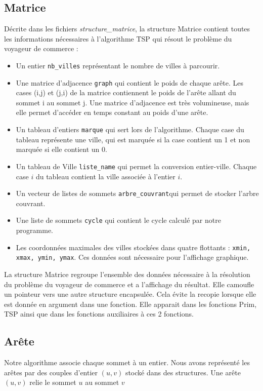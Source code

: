 \documentclass[a4paper,11pt]{article}
\begin{document}
\subsection{Matrice} %
Décrite dans les fichiers \emph{structure\_matrice}, la structure \textsf{Matrice} contient toutes les informations nécessaires à l'algorithme TSP qui résout le problème du voyageur de commerce :
\begin{itemize}
\renewcommand{\FrenchLabelItem}{\textbullet}
\item Un entier \texttt{nb\_villes} représentant le nombre de villes à parcourir.
\item Une matrice d'adjacence \texttt{graph} qui contient le poids de chaque arête. Les cases (i,j) et (j,i) de la matrice contiennent le poids de l'arête allant du sommet i au sommet j. Une matrice d'adjacence est très volumineuse, mais elle permet d'accéder en temps constant au poids d'une arête.
\item Un tableau d'entiers \texttt{marque} qui sert lors de l'algorithme. Chaque case du tableau représente une ville, qui est marquée si la case contient un 1 et non marquée si elle contient un 0.
\item Un tableau de \textsf{Ville} \texttt{liste\_name} qui permet la conversion entier-ville. Chaque case $i$ du tableau contient la ville associée à l'entier $i$.
\item Un vecteur de listes de sommets \texttt{arbre\_couvrant}qui permet de stocker l'arbre couvrant.
\item Une liste de sommets \texttt{cycle} qui contient le cycle calculé par notre programme.
\item Les coordonnées maximales des villes stockées dans quatre flottants : \texttt{xmin, xmax, ymin, ymax}. Ces données sont nécessaire pour l'affichage graphique.
\end{itemize}

La structure Matrice regroupe l'ensemble des données nécessaire à la résolution du problème du voyageur de commerce et a l'affichage du résultat.
Elle camoufle un pointeur vers une autre structure encapsulée. Cela évite la recopie lorsque elle est donnée en argument dans une fonction. Elle apparait dans les fonctions Prim, TSP ainsi que dans les fonctions auxiliaires à ces 2 fonctions.

\subsection{Arête}
Notre algorithme associe chaque sommet à un entier. Nous avons représenté les arêtes par des couples d'entier $(u, v)$ stocké dans des structures. Une arête $(u, v)$ relie le sommet $u$ au sommet $v$
\end{document}
